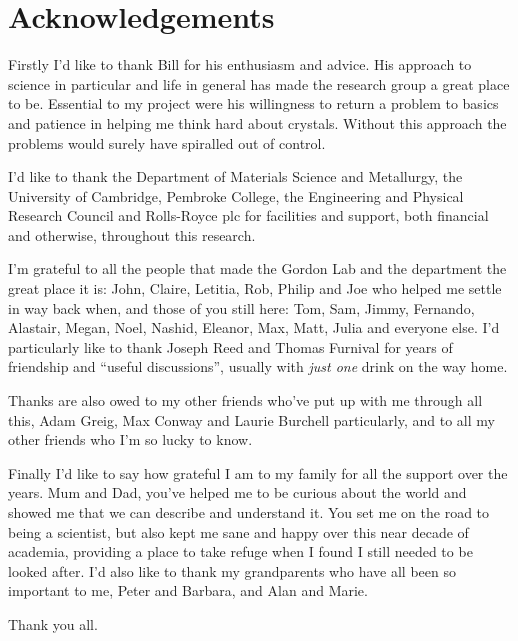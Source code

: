 \clearpage

\doublespacing

\section*{Acknowledgements}


Firstly I'd like to thank Bill for his enthusiasm and advice. His approach to science in particular and life in general has made the research group a great place to be. Essential to my project were his willingness to return a problem to basics and patience in helping me think hard about crystals. Without this approach the problems would surely have spiralled out of control.

I'd like to thank the Department of Materials Science and Metallurgy, the University of Cambridge, Pembroke College, the Engineering and Physical Research Council and Rolls-Royce plc for facilities and support, both financial and otherwise, throughout this research.

I'm grateful to all the people that made the Gordon Lab and the department the great place it is: John, Claire, Letitia, Rob, Philip and Joe who helped me settle in way back when, and those of you still here: Tom, Sam, Jimmy, Fernando, Alastair, Megan, Noel, Nashid, Eleanor, Max, Matt, Julia and everyone else. 
I'd particularly like to thank Joseph Reed and Thomas Furnival for years of friendship and ``useful discussions'', usually with \emph{just one} drink on the way home.

Thanks are also owed to my other friends who've put up with me through all this, Adam Greig, Max Conway and Laurie Burchell particularly, and to all my other friends who I'm so lucky to know.

Finally I'd like to say how grateful I am to my family for all the support over the years.
Mum and Dad, you've helped me to be curious about the world and showed me that we can describe and understand it. You set me on the road to being a scientist, but also kept me sane and happy over this near decade of academia, providing a place to take refuge when I found I still needed to be looked after. I'd also like to thank my grandparents who have all been so important to me, Peter and Barbara, and Alan and Marie.


Thank you all.

























































